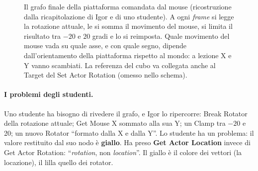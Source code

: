 \begin{figure}[htbp]
\caption{Il grafo finale della piattaforma comandata dal mouse (ricostruzione dalla
ricapitolazione di Igor e di uno studente). A ogni \emph{frame} si legge la rotazione
attuale, le si somma il movimento del mouse, si limita il risultato tra $-20$ e $20$
gradi e lo si reimposta. Quale movimento del mouse vada su quale asse, e con quale
segno, dipende dall'orientamento della piattaforma rispetto al mondo: a lezione X e Y
vanno scambiati. La referenza del cubo va collegata anche al Target del Set Actor
Rotation (omesso nello schema).}
\label{ue2:fig:mouse}
\end{figure}

\paragraph{I problemi degli studenti.} Uno studente ha bisogno di rivedere il grafo, e
Igor lo ripercorre: Break Rotator della rotazione attuale; Get Mouse X sommato alla sua
Y; un Clamp tra $-20$ e 20; un nuovo Rotator ``formato dalla X e dalla Y''. Lo studente
ha un problema: il valore restituito dal suo nodo è \textbf{giallo}. Ha preso \textbf{Get
Actor Location} invece di Get Actor Rotation: ``\emph{rotation}, non \emph{location}''.
Il giallo è il colore dei vettori (la locazione), il lilla quello dei rotator.

